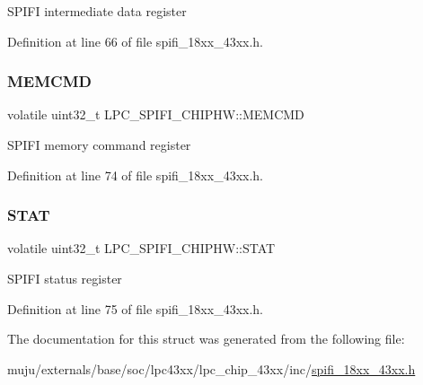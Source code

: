 S\+P\+I\+FI intermediate data register 

Definition at line 66 of file spifi\+\_\+18xx\+\_\+43xx.\+h.

\mbox{\label{struct_l_p_c___s_p_i_f_i___c_h_i_p_h_w_a25ed30206ef50e1a253fa379ca579b66}} 
\subsubsection{\texorpdfstring{M\+E\+M\+C\+MD}{MEMCMD}}
{\footnotesize\ttfamily volatile uint32\+\_\+t L\+P\+C\+\_\+\+S\+P\+I\+F\+I\+\_\+\+C\+H\+I\+P\+H\+W\+::\+M\+E\+M\+C\+MD}

S\+P\+I\+FI memory command register 

Definition at line 74 of file spifi\+\_\+18xx\+\_\+43xx.\+h.

\mbox{\label{struct_l_p_c___s_p_i_f_i___c_h_i_p_h_w_a6616b2a89aa36854e8479613dc797fda}} 
\subsubsection{\texorpdfstring{S\+T\+AT}{STAT}}
{\footnotesize\ttfamily volatile uint32\+\_\+t L\+P\+C\+\_\+\+S\+P\+I\+F\+I\+\_\+\+C\+H\+I\+P\+H\+W\+::\+S\+T\+AT}

S\+P\+I\+FI status register 

Definition at line 75 of file spifi\+\_\+18xx\+\_\+43xx.\+h.



The documentation for this struct was generated from the following file\+:\begin{DoxyCompactItemize}
\item 
muju/externals/base/soc/lpc43xx/lpc\+\_\+chip\+\_\+43xx/inc/\hyperlink{spifi__18xx__43xx_8h}{spifi\+\_\+18xx\+\_\+43xx.\+h}\end{DoxyCompactItemize}
